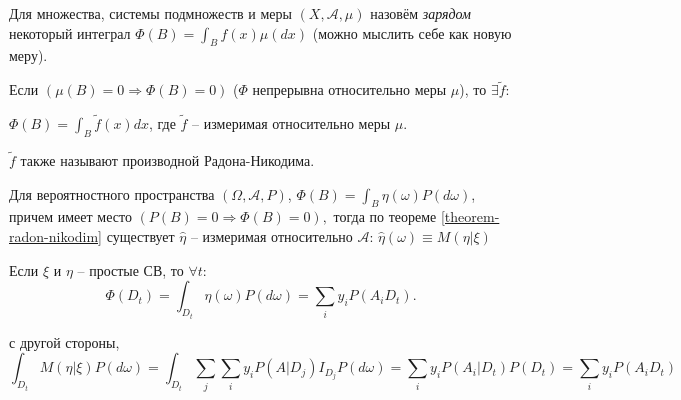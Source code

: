 \begin{theorem}\label{theorem-radon-nikodim}
  Для множества, системы подмножеств и меры $(X, \mathcal{A}, \mu)$ назовём \emph{зарядом}
  некоторый интеграл $\Phi(B) = \int_B f(x) \mu(dx)$ (можно мыслить себе как новую меру).

  Если $(\mu(B) = 0 \Rightarrow \Phi(B) = 0)$ ($\Phi$ непрерывна относительно меры $\mu$),
  то $\exists \tilde f$:

  $\Phi(B) = \int_B \tilde f(x) dx$, где $\tilde f$ -- измеримая относительно меры $\mu$.

  $\tilde f$ также называют производной Радона-Никодима.
\end{theorem}

\begin{definition}
  Для вероятностного пространства $(\Omega, \mathcal{A}, P)$, 
  $\Phi(B) = \int_B \eta(\omega) P(d\omega)$, причем имеет место $(P(B) = 0 \Rightarrow \Phi(B) = 0), $ тогда по теореме \ref{theorem-radon-nikodim} существует $\hat{\eta}$ -- измеримая относительно $\mathcal{A}$:
  $\hat{\eta} (\omega) \equiv M(\eta | \xi)$
\end{definition}

\begin{ex}
  Если $\xi$ и $\eta$ -- простые СВ, то 
  $\forall t $:
  \[
    \Phi(D_t) = \int_{D_t} \eta(\omega) P(d\omega) = \sum_i y_i P(A_i D_t).
  \]

  с другой стороны,
  \[
    \int_{D_t} M(\eta | \xi) P(d\omega) = \int_{D_t} \sum_j \sum_i y_i P(A|D_j) I_{D_j} P(d\omega)
    = \sum_i y_i P(A_i|D_t) P(D_t) = \sum_i y_i P(A_i D_t)
  \]
\end{ex}





